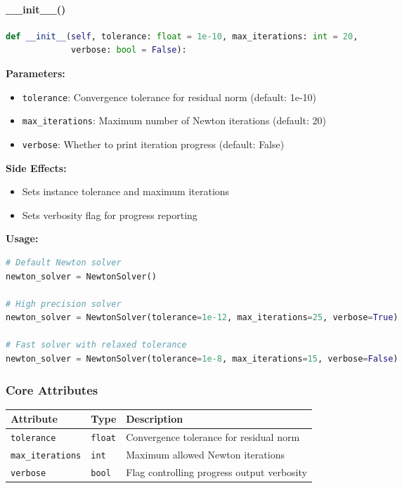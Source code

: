 \paragraph{\_\_init\_\_()}\leavevmode
\begin{lstlisting}[language=Python, caption=NewtonSolver Constructor]
def __init__(self, tolerance: float = 1e-10, max_iterations: int = 20,
             verbose: bool = False):
\end{lstlisting}

\textbf{Parameters:}
\begin{itemize}
    \item \texttt{tolerance}: Convergence tolerance for residual norm (default: 1e-10)
    \item \texttt{max\_iterations}: Maximum number of Newton iterations (default: 20)
    \item \texttt{verbose}: Whether to print iteration progress (default: False)
\end{itemize}

\textbf{Side Effects:}
\begin{itemize}
    \item Sets instance tolerance and maximum iterations
    \item Sets verbosity flag for progress reporting
\end{itemize}

\textbf{Usage:}
\begin{lstlisting}[language=Python, caption=NewtonSolver Constructor Usage]
# Default Newton solver
newton_solver = NewtonSolver()

# High precision solver
newton_solver = NewtonSolver(tolerance=1e-12, max_iterations=25, verbose=True)

# Fast solver with relaxed tolerance
newton_solver = NewtonSolver(tolerance=1e-8, max_iterations=15, verbose=False)
\end{lstlisting}

\subsubsection{Core Attributes}

\begin{longtable}{|p{4cm}|p{3cm}|p{7cm}|}
\hline
\textbf{Attribute} & \textbf{Type} & \textbf{Description} \\
\hline
\endhead

\texttt{tolerance} & \texttt{float} & Convergence tolerance for residual norm \\
\hline

\texttt{max\_iterations} & \texttt{int} & Maximum allowed Newton iterations \\
\hline

\texttt{verbose} & \texttt{bool} & Flag controlling progress output verbosity \\
\hline

\end{longtable}

